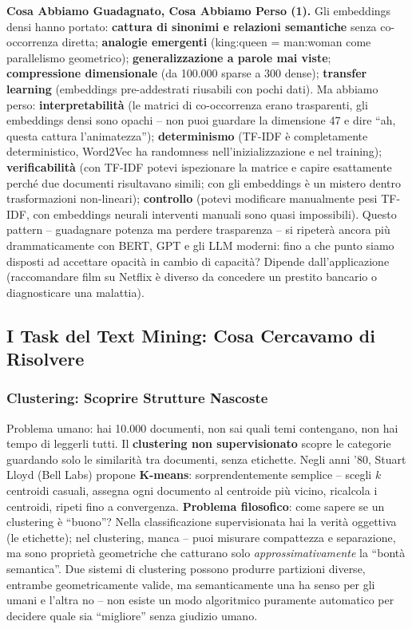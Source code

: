 \documentclass[12pt,a4paper]{article}
\begin{document}
\begin{quizbox}
\textbf{Cosa Abbiamo Guadagnato, Cosa Abbiamo Perso (1).}
Gli embeddings densi hanno portato: \textbf{cattura di sinonimi e relazioni semantiche} senza co-occorrenza diretta; \textbf{analogie emergenti} (king:queen = man:woman come parallelismo geometrico); \textbf{generalizzazione a parole mai viste}; \textbf{compressione dimensionale} (da 100.000 sparse a 300 dense); \textbf{transfer learning} (embeddings pre-addestrati riusabili con pochi dati). Ma abbiamo perso: \textbf{interpretabilit\`a} (le matrici di co-occorrenza erano trasparenti, gli embeddings densi sono opachi -- non puoi guardare la dimensione 47 e dire ``ah, questa cattura l'animatezza''); \textbf{determinismo} (TF-IDF \`e completamente deterministico, Word2Vec ha randomness nell'inizializzazione e nel training); \textbf{verificabilit\`a} (con TF-IDF potevi ispezionare la matrice e capire esattamente perch\'e due documenti risultavano simili; con gli embeddings \`e un mistero dentro trasformazioni non-lineari); \textbf{controllo} (potevi modificare manualmente pesi TF-IDF, con embeddings neurali interventi manuali sono quasi impossibili). Questo pattern -- guadagnare potenza ma perdere trasparenza -- si ripeter\`a ancora pi\`u drammaticamente con BERT, GPT e gli LLM moderni: fino a che punto siamo disposti ad accettare opacit\`a in cambio di capacit\`a? Dipende dall'applicazione (raccomandare film su Netflix \`e diverso da concedere un prestito bancario o diagnosticare una malattia).
\end{quizbox}

\subsection{I Task del Text Mining: Cosa Cercavamo di Risolvere}

\subsubsection{Clustering: Scoprire Strutture Nascoste}

Problema umano: hai 10.000 documenti, non sai quali temi contengano, non hai tempo di leggerli tutti. Il \textbf{clustering non supervisionato} scopre le categorie guardando solo le similarit\`a tra documenti, senza etichette. Negli anni '80, Stuart Lloyd (Bell Labs) propone \textbf{K-means}: sorprendentemente semplice -- scegli $k$ centroidi casuali, assegna ogni documento al centroide pi\`u vicino, ricalcola i centroidi, ripeti fino a convergenza. \textbf{Problema filosofico}: come sapere se un clustering \`e ``buono''? Nella classificazione supervisionata hai la verit\`a oggettiva (le etichette); nel clustering, manca -- puoi misurare compattezza e separazione, ma sono propriet\`a geometriche che catturano solo \emph{approssimativamente} la ``bont\`a semantica''. Due sistemi di clustering possono produrre partizioni diverse, entrambe geometricamente valide, ma semanticamente una ha senso per gli umani e l'altra no -- non esiste un modo algoritmico puramente automatico per decidere quale sia ``migliore'' senza giudizio umano.
\end{document}
